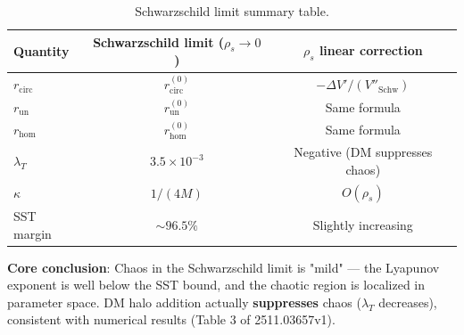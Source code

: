 \documentclass[12pt]{article}
\begin{document}
\begin{table}[H]
\centering
\begin{tabular}{l c c}
\toprule
\textbf{Quantity} & \textbf{Schwarzschild limit ($\rho_s \to 0$)} & \textbf{$\rho_s$ linear correction} \\
\midrule
$r_{\text{circ}}$ & $r_{\text{circ}}^{(0)}$ & $-\Delta V'/(V''_{\text{Schw}})$ \\
$r_{\text{un}}$ & $r_{\text{un}}^{(0)}$ & Same formula \\
$r_{\text{hom}}$ & $r_{\text{hom}}^{(0)}$ & Same formula \\
$\lambda_T$ & $3.5 \times 10^{-3}$ & Negative (DM suppresses chaos) \\
$\kappa$ & $1/(4M)$ & $O(\rho_s)$ \\
SST margin & $\sim 96.5\%$ & Slightly increasing \\
\bottomrule
\end{tabular}
\caption{Schwarzschild limit summary table.}
\label{tab:schw_limit}
\end{table}

\textbf{Core conclusion}: Chaos in the Schwarzschild limit is "mild" --- the Lyapunov exponent is well below the SST bound, and the chaotic region is localized in parameter space. DM halo addition actually \textbf{suppresses} chaos ($\lambda_T$ decreases), consistent with numerical results (Table 3 of 2511.03657v1).
\end{document}

